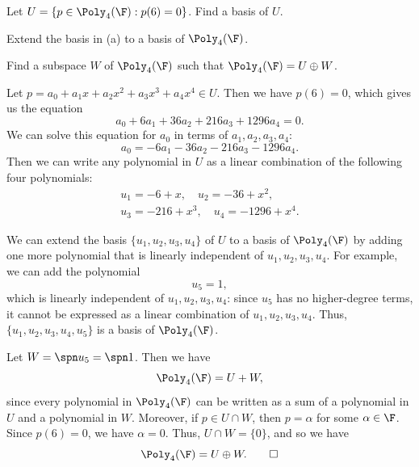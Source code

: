 \begin{exercise}\leavevmode
\begin{parts}
\item Let $U=\{p\in\Poly_4(\F) : p(6)=0\}$. Find a basis of $U$.
\item Extend the basis in (a) to a basis of $\Poly_4(\F)$.
\item Find a subspace $W$ of $\Poly_4(\F)$ such that $\Poly_4(\F)=U\oplus W$.
\end{parts}
\end{exercise}
\begin{solution}
\begin{parts}
\item Let $p=a_0+a_1x+a_2x^2+a_3x^3+a_4x^4\in U$. Then we have $p(6)=0$, which
  gives us the equation
  \[ a_0+6a_1+36a_2+216a_3+1296a_4 = 0. \]
  We can solve this equation for $a_0$ in terms of $a_1,a_2,a_3,a_4$:
  \[ a_0 = -6a_1-36a_2-216a_3-1296a_4. \]
  Then we can write any polynomial in $U$ as a linear combination of the
  following four polynomials:
  \begin{gather*}
  u_1=-6+x, \quad u_2=-36+x^2,\\
  u_3=-216+x^3, \quad u_4=-1296+x^4.
  \end{gather*}
\item We can extend the basis $\{u_1,u_2,u_3,u_4\}$ of $U$ to a basis of
  $\Poly_4(\F)$ by adding one more polynomial that is linearly independent of
  $u_1,u_2,u_3,u_4$. For example, we can add the polynomial
  \[ u_5 = 1, \]
  which is linearly independent of $u_1,u_2,u_3,u_4$: since $u_5$ has no
  higher-degree terms, it cannot be expressed as a linear combination of
  $u_1,u_2,u_3,u_4$. Thus, $\{u_1,u_2,u_3,u_4,u_5\}$ is a basis of
  $\Poly_4(\F)$.
\item Let $W=\spn u_5=\spn 1$. Then we have
  \[ \Poly_4(\F) = U+W, \]
  since every polynomial in $\Poly_4(\F)$ can be written as a sum of a
  polynomial in $U$ and a polynomial in $W$. Moreover, if $p\in U\cap W$, then
  $p=\alpha$ for some $\alpha\in\F$. Since $p(6)=0$, we have $\alpha=0$. Thus,
  $U\cap W=\{0\}$, and so we have
  \[ \Poly_4(\F) = U\oplus W. \qedhere \]
\end{parts}
\end{solution}

